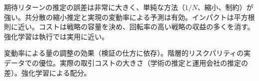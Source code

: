 \begin{keybox}[まとめ]
\begin{description}[leftmargin=1em,style=nextline]
\item[確立している]
  期待リターンの推定の誤差は非常に大きく、単純な方法（$1/N$、縮小、制約）が強い。共分散の縮小推定と実現の変動率による予測は有効。インパクトは平方根則に近い。コストは戦略の容量を決め、回転率の高い戦略の収益の多くを消す。強化学習は執行では実用に近い。
\item[議論が続いている]
  変動率による量の調整の効果（検証の仕方に依存）。階層的リスクパリティの実データでの優位。実際の取引コストの大きさ（学術の推定と運用会社の推定の差）。強化学習による配分。
\end{description}
\end{keybox}
